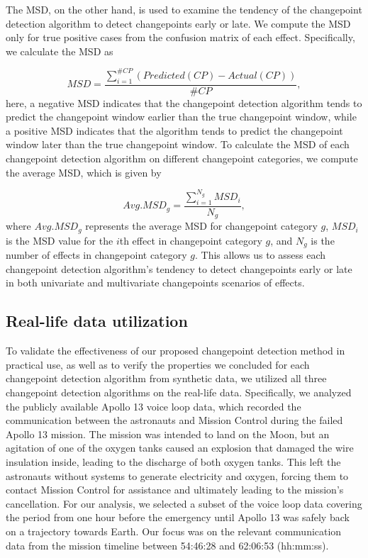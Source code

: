 \documentclass[]{interact}
\theoremstyle{plain}%
\theoremstyle{definition}
\theoremstyle{remark}
\begin{document}
{	The MSD, on the other hand, is used to examine the tendency of the changepoint detection algorithm to detect changepoints early or late. We compute the MSD only for true positive cases from the confusion matrix of each effect. Specifically, we calculate the MSD as
	
	\begin{equation} \label{11}
		MSD = \frac{\sum_{i = 1}^{\#CP} (Predicted(CP) - Actual(CP))}{\#CP},
	\end{equation}
	here, a negative MSD indicates that the changepoint detection algorithm tends to predict the changepoint window earlier than the true changepoint window, while a positive MSD indicates that the algorithm tends to predict the changepoint window later than the true changepoint window. To calculate the MSD of each changepoint detection algorithm on different changepoint categories, we compute the average MSD, which is given by
	
	\begin{equation} \label{12}
		Avg.MSD_g = \frac{\sum_{i=1}^{N_g} MSD_i}{N_g},
	\end{equation}
	where $Avg.MSD_g$ represents the average MSD for changepoint category $g$, $MSD_i$ is the MSD value for the $i$th effect in changepoint category $g$, and $N_g$ is the number of effects in changepoint category $g$. This allows us to assess each changepoint detection algorithm's tendency to detect changepoints early or late in both univariate and multivariate changepoints scenarios of effects.
	
	\subsection{Real-life data utilization} \label{sec:Apollo 13 intro}
	
	\hspace{0.2cm} To validate the effectiveness of our proposed changepoint detection method in practical use, as well as to verify the properties we concluded for each changepoint detection algorithm from synthetic data, we utilized all three changepoint detection algorithms on the real-life data. Specifically, we analyzed the publicly available Apollo 13 voice loop data, which recorded the communication between the astronauts and Mission Control during the failed Apollo 13 mission. The mission was intended to land on the Moon, but an agitation of one of the oxygen tanks caused an explosion that damaged the wire insulation inside, leading to the discharge of both oxygen tanks. This left the astronauts without systems to generate electricity and oxygen, forcing them to contact Mission Control for assistance and ultimately leading to the mission's cancellation. For our analysis, we selected a subset of the voice loop data covering the period from one hour before the emergency until Apollo 13 was safely back on a trajectory towards Earth. Our focus was on the relevant communication data from the mission timeline between 54:46:28 and 62:06:53 (hh:mm:ss). \\
	
}
\end{document}
